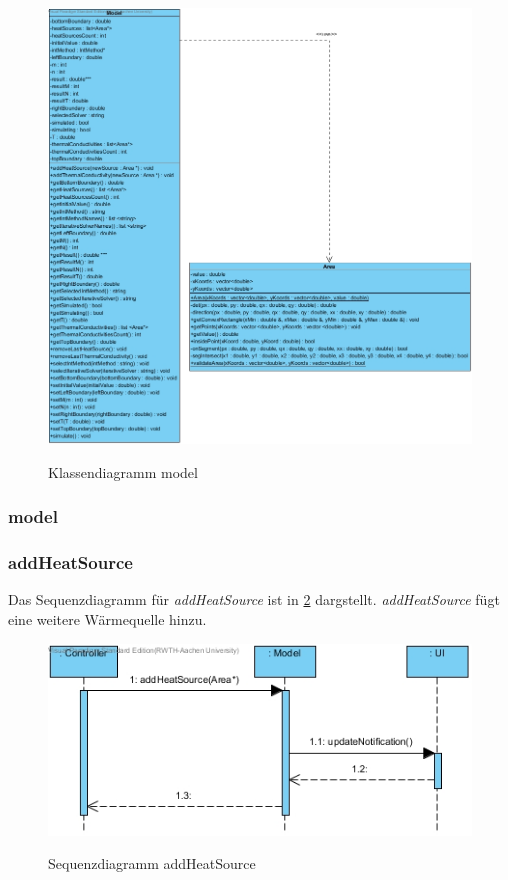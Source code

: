 \begin{figure}[H]
	\centering
	\includegraphics[scale=.6]{Bilder/model.jpg}\\
	\caption{Klassendiagramm model}
	\label{Klassendiagramm model}
\end{figure}

\subsubsection{model}

\subsubsection*{addHeatSource}

Das Sequenzdiagramm für \emph{addHeatSource} ist in \ref{Sequenzdiagramm addHeatSource} dargstellt. \emph{addHeatSource} fügt eine weitere Wärmequelle hinzu.

\begin{figure}[H]
	\centering
	\includegraphics[scale=.6]{Bilder/Model__addHeatSource().jpg}\\
	\caption{Sequenzdiagramm addHeatSource}
	\label{Sequenzdiagramm addHeatSource}
\end{figure}

